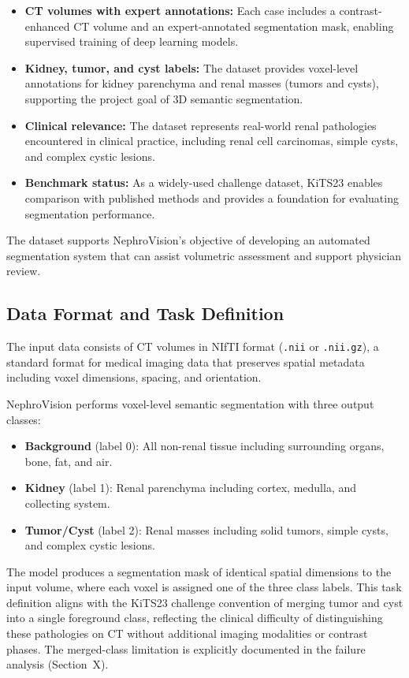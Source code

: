 \begin{itemize}
    \item \textbf{CT volumes with expert annotations:} Each case includes a contrast-enhanced CT volume and an expert-annotated segmentation mask, enabling supervised training of deep learning models.
    \item \textbf{Kidney, tumor, and cyst labels:} The dataset provides voxel-level annotations for kidney parenchyma and renal masses (tumors and cysts), supporting the project goal of 3D semantic segmentation.
    \item \textbf{Clinical relevance:} The dataset represents real-world renal pathologies encountered in clinical practice, including renal cell carcinomas, simple cysts, and complex cystic lesions.
    \item \textbf{Benchmark status:} As a widely-used challenge dataset, KiTS23 enables comparison with published methods and provides a foundation for evaluating segmentation performance.
\end{itemize}

The dataset supports NephroVision's objective of developing an automated segmentation system that can assist volumetric assessment and support physician review.

\subsection{Data Format and Task Definition}

The input data consists of CT volumes in NIfTI format (\texttt{.nii} or \texttt{.nii.gz}), a standard format for medical imaging data that preserves spatial metadata including voxel dimensions, spacing, and orientation.

NephroVision performs voxel-level semantic segmentation with three output classes:

\begin{itemize}
    \item \textbf{Background} (label 0): All non-renal tissue including surrounding organs, bone, fat, and air.
    \item \textbf{Kidney} (label 1): Renal parenchyma including cortex, medulla, and collecting system.
    \item \textbf{Tumor/Cyst} (label 2): Renal masses including solid tumors, simple cysts, and complex cystic lesions.
\end{itemize}

The model produces a segmentation mask of identical spatial dimensions to the input volume, where each voxel is assigned one of the three class labels. This task definition aligns with the KiTS23 challenge convention of merging tumor and cyst into a single foreground class, reflecting the clinical difficulty of distinguishing these pathologies on CT without additional imaging modalities or contrast phases. The merged-class limitation is explicitly documented in the failure analysis (Section~X).

